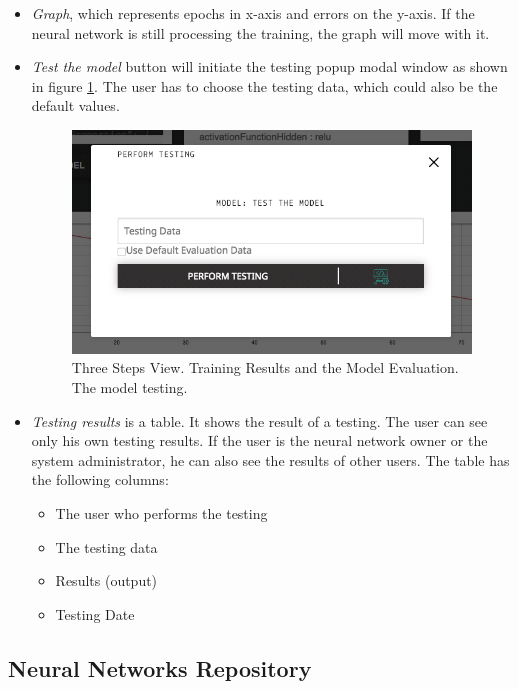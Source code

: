\begin{itemize}
\item \emph{Graph}, which represents epochs in x-axis and errors on the y-axis. If the neural network is still processing the training, the graph will move with it. 
\item \emph{Test the model} button will initiate the testing popup modal window as shown in figure \ref{fig:model_testing}. The user has to choose the testing data, which could also be the default values.

\begin{figure}[htbp]
\begin{center}
  \includegraphics[scale=0.5]{components/5/img/model_testing.png}
  \caption{Three Steps View. Training Results and the Model Evaluation. The model testing.}
  \label{fig:model_testing}
\end{center}
\end{figure}

\item \emph{Testing results} is a table. It shows the result of a testing. The user can see only his own testing results. If the user is the neural network owner or the system administrator, he can also see the results of other users. The table has the following columns:
\begin{itemize}
\item The user who performs the testing 
\item The testing data
\item Results (output)
\item Testing Date
\end{itemize}


\end{itemize}





\subsection{Neural Networks Repository}\label{Neural Networks Repository}

